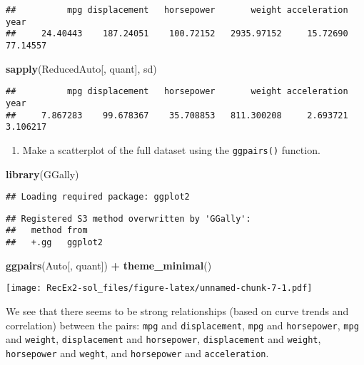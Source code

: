\documentclass[
]{article}
\newenvironment{Shaded}{\begin{snugshade}}{\end{snugshade}}
\newcommand{\FunctionTok}[1]{\textcolor[rgb]{0.13,0.29,0.53}{\textbf{#1}}}
\newcommand{\NormalTok}[1]{#1}
\newcommand{\SpecialCharTok}[1]{\textcolor[rgb]{0.81,0.36,0.00}{\textbf{#1}}}
\providecommand{\tightlist}{%
  \setlength{\itemsep}{0pt}\setlength{\parskip}{0pt}}
\begin{document}
\begin{verbatim}
##          mpg displacement   horsepower       weight acceleration         year 
##     24.40443    187.24051    100.72152   2935.97152     15.72690     77.14557
\end{verbatim}

\begin{Shaded}
\begin{Highlighting}[]
\FunctionTok{sapply}\NormalTok{(ReducedAuto[, quant], sd)}
\end{Highlighting}
\end{Shaded}

\begin{verbatim}
##          mpg displacement   horsepower       weight acceleration         year 
##     7.867283    99.678367    35.708853   811.300208     2.693721     3.106217
\end{verbatim}

\begin{enumerate}
\def\labelenumi{\alph{enumi})}
\setcounter{enumi}{4}
\tightlist
\item
  Make a scatterplot of the full dataset using the \texttt{ggpairs()}
  function.
\end{enumerate}

\begin{Shaded}
\begin{Highlighting}[]
\FunctionTok{library}\NormalTok{(GGally)}
\end{Highlighting}
\end{Shaded}

\begin{verbatim}
## Loading required package: ggplot2
\end{verbatim}

\begin{verbatim}
## Registered S3 method overwritten by 'GGally':
##   method from   
##   +.gg   ggplot2
\end{verbatim}

\begin{Shaded}
\begin{Highlighting}[]
\FunctionTok{ggpairs}\NormalTok{(Auto[, quant]) }\SpecialCharTok{+} \FunctionTok{theme\_minimal}\NormalTok{()}
\end{Highlighting}
\end{Shaded}

\texttt{[image: RecEx2-sol\_files/figure-latex/unnamed-chunk-7-1.pdf]}

We see that there seems to be strong relationships (based on curve
trends and correlation) between the pairs: \texttt{mpg} and
\texttt{displacement}, \texttt{mpg} and \texttt{horsepower},
\texttt{mpg} and \texttt{weight}, \texttt{displacement} and
\texttt{horsepower}, \texttt{displacement} and \texttt{weight},
\texttt{horsepower} and \texttt{weght}, and \texttt{horsepower} and
\texttt{acceleration}.
\end{document}
